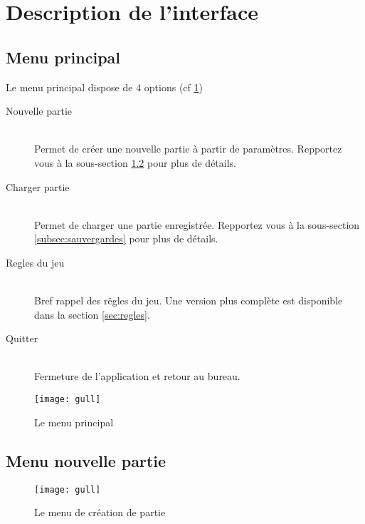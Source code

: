 \section{Description de l'interface}
	\subsection{Menu principal}
		Le menu principal dispose de 4 options (cf \ref{fig:menuPrinc})
		
		\begin{description}
			\item[Nouvelle partie] \hfill \\
				Permet de créer une nouvelle partie à partir de paramètres. Repportez vous à la sous-section \ref{subsec:nouvellpartie} pour plus de détails.
			\item[Charger partie] \hfill \\
				Permet de charger une partie enregistrée. Repportez vous à la sous-section \ref{subsec:sauvergardes} pour plus de détails.
			\item[Regles du jeu] \hfill \\
				Bref rappel des rêgles du jeu. Une version plus complète est disponible dans la section \ref{sec:regles}.
			\item[Quitter] \hfill \\
				Fermeture de l'application et retour au bureau.
		\end{description}
		
		\begin{figure}[h!]
			\caption{Le menu principal}
			\label{fig:menuPrinc}
			\centering
			\texttt{[image: gull]}
		\end{figure}
	
	\subsection{Menu nouvelle partie}
		\label{subsec:nouvellpartie}
		
		\begin{figure}[h!]
			\caption{Le menu de création de partie}
			\label{fig:menuCreat}
			\centering
			\texttt{[image: gull]}
		\end{figure}
		
